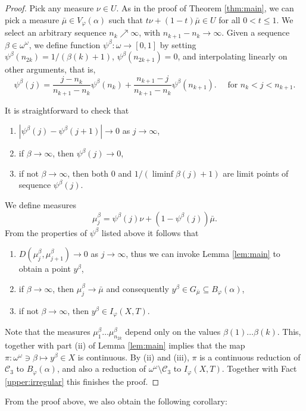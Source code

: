 \documentclass{amsart}
\theoremstyle{definition}
\renewcommand{\phi}{\varphi}
\begin{document}
\begin{proof}
Pick any measure $\nu \in U$. As in the proof of Theorem \ref{thm:main}, we can pick a measure $\bar{\mu} \in V_\phi(\alpha)$ such that $t \nu + (1-t) \bar{\mu} \in U$ for all $0 < t \le 1$. We select an arbitrary sequence $n_k \nearrow \infty$, with $n_{k+1} - n_k \to \infty$. Given a sequence $\beta \in  \omega ^ \omega$, we define function $\psi^\beta \colon \omega \to [0, 1]$ by setting $\psi^\beta(n_{2k}) = 1/(\beta(k) + 1)$, $\psi^\beta(n_{2k+1}) = 0$, and interpolating linearly on other arguments, that is,
\begin{equation}
\psi^\beta (j) = \frac{j - n_k}{n_{k+1} - n_k} \psi^\beta(n_k) + \frac{n_{k+1} - j}{n_{k+1} - n_k} \psi^\beta(n_{k+1}).
\quad \textrm{ for } n_k < j < n_{k+1}.
\end{equation}

It is straightforward to check that
\begin{enumerate}
  \item $|\psi^\beta(j) - \psi^\beta(j+1)| \to 0$ as $j \to \infty$,
  \item if $\beta \to \infty$, then $\psi^\beta(j) \to 0$,
  \item if not $\beta \to \infty$, then both $0$ and $1 / (\liminf \beta(j) + 1)$ are limit points of sequence $\psi^\beta(j)$.
\end{enumerate}
We define measures
\[
\mu^\beta_j = \psi^\beta(j) \nu + (1 - \psi^\beta(j)) \bar{\mu}.
\]
From the properties of $\psi^\beta$ listed above it follows that
\begin{enumerate}
  \item $D(\mu^\beta_j, \mu^\beta_{j+1}) \to 0$ as $j \to \infty$, thus we can invoke Lemma \ref{lem:main} to obtain a point $y^\beta$,
  \item if $\beta \to \infty$, then $\mu_j^\beta \to \bar{\mu}$ and consequently $y^\beta \in G_{\bar{\mu}} \subseteq B_\phi(\alpha)$,
  \item if not $\beta \to \infty$, then $y^\beta \in I_\phi(X,T)$.
\end{enumerate}
Note that the measures $\mu^\beta_1 \dots \mu^\beta_{n_{2k}}$ depend only on the values $\beta(1) \dots \beta(k)$. This, together with part (ii) of Lemma \ref{lem:main} implies that the map $\pi \colon  \omega ^ \omega \ni \beta \mapsto y^\beta \in X$ is continuous. By (ii) and (iii), $\pi$ is a continuous reduction of $\mathcal{C}_3$ to $B_\phi(\alpha)$, and also a reduction of $ \omega ^ \omega \setminus \mathcal{C}_3$ to $I_\phi(X,T)$. Together with Fact \ref{upper:irregular} this finishes the proof.
\end{proof}
From the proof above, we also obtain the following corollary:
\end{document}

